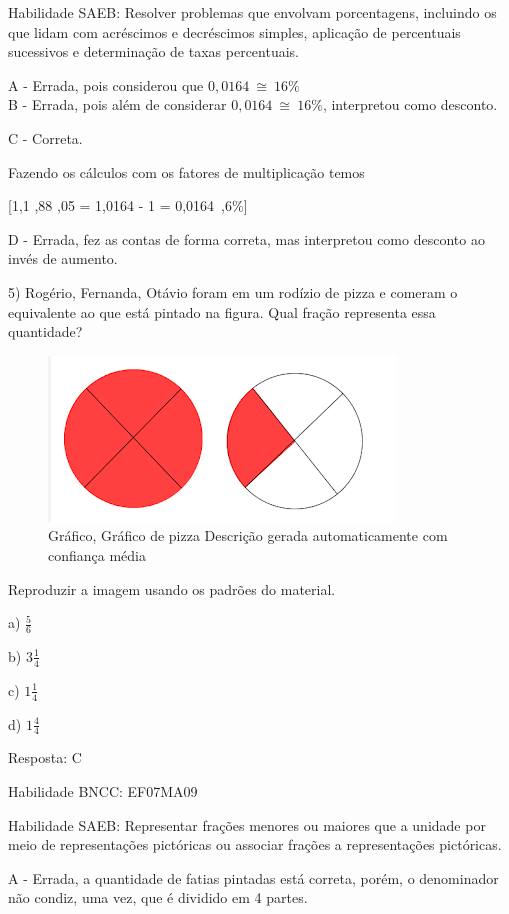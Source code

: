 Habilidade SAEB: Resolver problemas que envolvam porcentagens, incluindo
os que lidam com acréscimos e decréscimos simples, aplicação de
percentuais sucessivos e determinação de taxas percentuais.

A - Errada, pois considerou que \(0,0164\  \cong \ 16\%\)\\
B - Errada, pois além de considerar \(0,0164\  \cong \ 16\%\),
interpretou como desconto.

C - Correta.

Fazendo os cálculos com os fatores de multiplicação temos

[1,1 ,88 ,05 = 1,0164 - 1 = 0,0164\  ,6\%]

D - Errada, fez as contas de forma correta, mas interpretou como
desconto ao invés de aumento.

5) Rogério, Fernanda, Otávio foram em um rodízio de pizza e comeram o
equivalente ao que está pintado na figura. Qual fração representa essa
quantidade?

\begin{figure}
\centering
\includegraphics[width=3.625in,height=1.72917in]{./imgSAEB_7_MAT/media/image95.png}
\caption{Gráfico, Gráfico de pizza Descrição gerada automaticamente com
confiança média}
\end{figure}

Reproduzir a imagem usando os padrões do material.

a) \(\frac{5}{6}\)

b) \(3\frac{1}{4}\)

c) \(1\frac{1}{4}\)

d) \(1\frac{4}{4}\)

Resposta: C

Habilidade BNCC: EF07MA09

Habilidade SAEB: Representar frações menores ou maiores que a unidade
por meio de representações pictóricas ou associar frações a
representações pictóricas.

A - Errada, a quantidade de fatias pintadas está correta, porém, o
denominador não condiz, uma vez, que é dividido em 4 partes.

